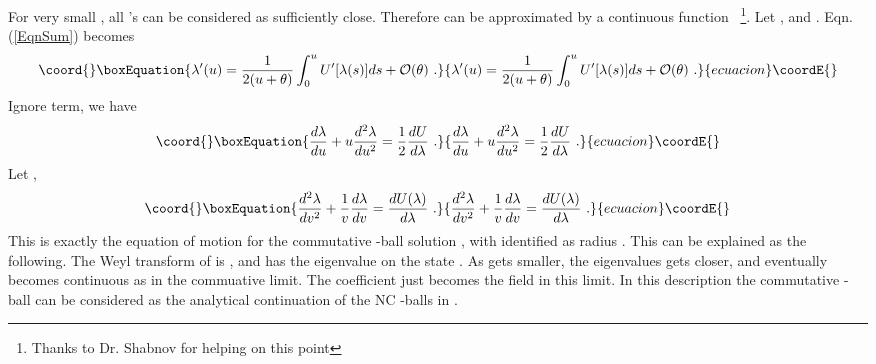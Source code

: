 \documentclass[a4paper,a4paper]{article}
\begin{document}
For very small \myHighlight{$\theta$}\coordHE{}, all \coordHE{}'s can be considered as
sufficiently close. Therefore \coordHE{} can be approximated by a
continuous function \coordHE{}~\footnote{Thanks to Dr. Shabnov for
helping on this point}. Let \coordHE{} , and
\coordHE{} . Eqn. (\ref{EqnSum}) becomes
\begin{equation}\coord{}\boxEquation{
\lambda'(u)=\frac 1{2(u+\theta)}\int_0^{u}U'[\lambda(s)]ds+{\cal
O}(\theta)\ .
}{
\lambda'(u)=\frac 1{2(u+\theta)}\int_0^{u}U'[\lambda(s)]ds+{\cal
O}(\theta)\ .
}{ecuacion}\coordE{}\end{equation}
Ignore \coordHE{} term, we have
\begin{equation}\coord{}\boxEquation{
\frac{d\lambda}{du}+u\frac{d^2\lambda}{du^2}=\frac
12\frac{dU}{d\lambda}\ .
}{
\frac{d\lambda}{du}+u\frac{d^2\lambda}{du^2}=\frac
12\frac{dU}{d\lambda}\ .
}{ecuacion}\coordE{}\end{equation}
Let \coordHE{} ,
\begin{equation}\coord{}\boxEquation{
  \frac{d^2\lambda}{dv^2}+\frac 1v\frac{d\lambda}{dv}=\frac
  {dU(\lambda)}{d\lambda}\ .
}{
  \frac{d^2\lambda}{dv^2}+\frac 1v\frac{d\lambda}{dv}=\frac
  {dU(\lambda)}{d\lambda}\ .
}{ecuacion}\coordE{}\end{equation}
This is exactly the equation of motion for the commutative \coordHE{}-ball 
solution \coordHE{} , 
with \coordHE{} identified as radius \coordHE{} . This can be explained as the following. The
Weyl transform of \coordHE{} is \coordHE{} , and \coordHE{} has the eigenvalue \coordHE{} on the state \coordHE{} .
As \myHighlight{$\theta$}\coordHE{} gets smaller, the eigenvalues \coordHE{} gets closer, and eventually
becomes continuous as \coordHE{} in the commuative limit. The coefficient
\coordHE{} just becomes the field \coordHE{} in this limit.
In this description 
the commutative \coordHE{}-ball can be considered as the analytical continuation of 
the NC \coordHE{}-balls in \myHighlight{$\theta$}\coordHE{} .  
\end{document}
